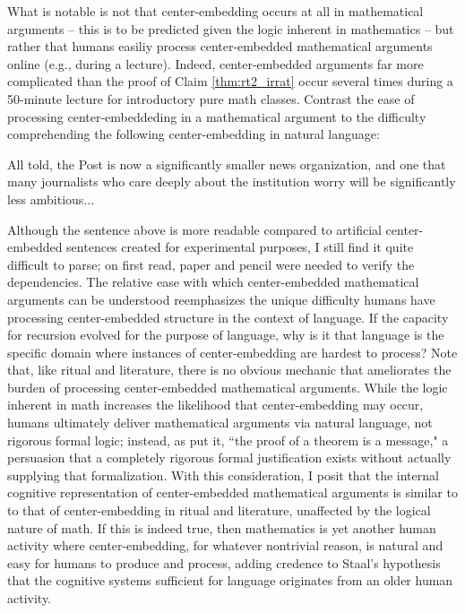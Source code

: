 \documentclass[12pt, letterpaper]{article}
\begin{document}
What is notable is not that center-embedding occurs at all in mathematical arguments -- this is to be predicted given the logic inherent in mathematics -- but rather that humans easiliy process center-embedded mathematical arguments online (e.g., during a lecture). 
Indeed, center-embedded arguments far more complicated than the proof of Claim \ref{thm:rt2_irrat} occur several times during a 50-minute lecture for introductory pure math classes. 
Contrast the ease of processing center-embeddeding in a mathematical argument to the difficulty comprehending the following center-embedding in natural language: 
\begin{center}
  \begin{minipage}{0.8\linewidth}
    All told, the Post is now a significantly smaller news organization, and one that many journalists who care deeply about the institution worry will be significantly less ambitious... \footnotemark
  \end{minipage}
\end{center}
Although the sentence above is more readable compared to artificial center-embedded sentences created for experimental purposes, I still find it quite difficult to parse;
on first read, paper and pencil were needed to verify the dependencies. 
The relative ease with which center-embedded mathematical arguments can be understood reemphasizes the unique difficulty humans have processing center-embedded structure in the context of language. 
If the capacity for recursion evolved for the purpose of language, why is it that language is the specific domain where instances of center-embedding are hardest to process?  
Note that, like ritual and literature, there is no obvious mechanic that ameliorates the burden of processing center-embedded mathematical arguments. 
While the logic inherent in math increases the likelihood that center-embedding may occur, humans ultimately deliver mathematical arguments via natural language, not rigorous formal logic;
instead, as \cite{lipton1979social} put it, ``the proof of a theorem is a message," a persuasion that a completely rigorous formal justification exists without actually supplying that formalization. 
With this consideration, I posit that the internal cognitive representation of center-embedded mathematical arguments is similar to to that of center-embedding in ritual and literature, unaffected by the logical nature of math. 
If this is indeed true, then mathematics is yet another human activity where center-embedding, for whatever nontrivial reason, is natural and easy for humans to produce and process, adding credence to Staal's hypothesis that the cognitive systems sufficient for language originates from an older human activity. 
\end{document}
